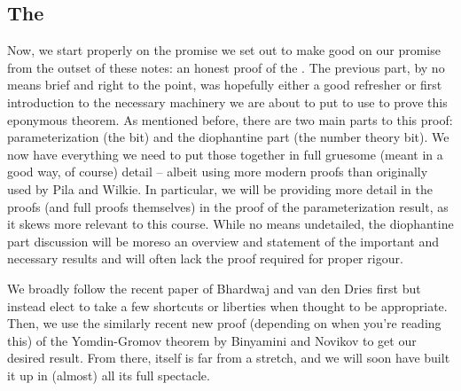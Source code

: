 % 
%
%

\begin{partbacktext}
\part{The \pwT}
\noindent Now, we start properly on the promise we set out to make good on our promise from the outset of these notes: an honest proof of the \pwt. The previous part, by no means brief and right to the point, was hopefully either a good refresher or first introduction to the necessary machinery we are about to put to use to prove this eponymous theorem. As mentioned before, there are two main parts to this proof: parameterization (the \om bit) and the diophantine part (the number theory bit). We now have everything we need to put those together in full gruesome (meant in a good way, of course) detail -- albeit using more modern proofs than originally used by Pila and Wilkie. In particular, we will be providing more detail in the proofs (and full proofs themselves) in the proof of the parameterization result, as it skews more relevant to this course. While no means undetailed, the diophantine part discussion will be moreso an overview and statement of the important and necessary results and will often lack the proof required for proper rigour.

We broadly follow the recent paper of Bhardwaj and van den Dries \cite{bhardwaj_pilawilkie_2022} first but instead elect to take a few shortcuts or liberties when thought to be appropriate. Then, we use the similarly recent new proof (depending on when you're reading this) of the Yomdin-Gromov theorem by Binyamini and Novikov \cite{binyamini_yomdingromov_2021} to get our desired result. From there, \pw itself is far from a stretch, and we will soon have built it up in (almost) all its full spectacle.

\end{partbacktext}

